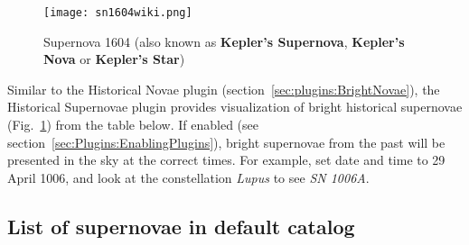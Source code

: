 \begin{figure}[ht]
\texttt{[image: sn1604wiki.png]}
\caption{Supernova 1604 (also known as \textbf{Kepler's Supernova}, \textbf{Kepler's Nova} or \textbf{Kepler's Star})}
\label{fig:SN1604}
\end{figure}


\noindent Similar to the Historical Novae plugin
(section~\ref{sec:plugins:BrightNovae}), the Historical Supernovae
plugin provides visualization of bright historical supernovae
(Fig.~\ref{fig:SN1604}) from the table below.
If enabled (see section~\ref{sec:Plugins:EnablingPlugins}), bright
supernovae from the past will be presented in the sky at the correct
times. For example, set date and time to 29 April 1006, and look at the constellation \emph{Lupus} to see \emph{SN 1006A}.


\subsection{List of supernovae in default catalog}
\label{sec:plugins:HistoricalSupernovae:list}


